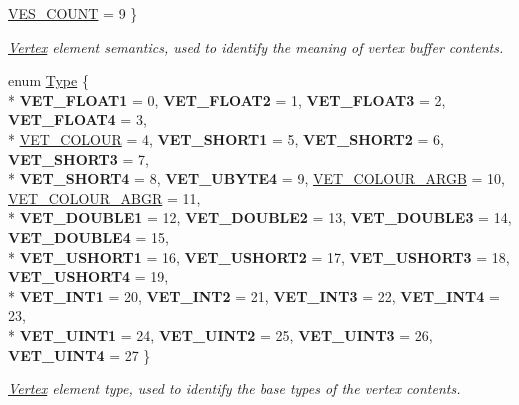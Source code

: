 \begin{DoxyCompactItemize}
\hyperlink{class_assimp_1_1_ogre_1_1_vertex_element_a34497be6620a9ecece6ff193a044d6bba3b4b518fc1b8d3e0cdbe053f37e95e31}{V\+E\+S\+\_\+\+C\+O\+U\+N\+T} = 9
 \}
\begin{DoxyCompactList}\small\item\em \hyperlink{class_assimp_1_1_vertex}{Vertex} element semantics, used to identify the meaning of vertex buffer contents. \end{DoxyCompactList}\item 
enum \hyperlink{class_assimp_1_1_ogre_1_1_vertex_element_a7737b533321652d410d9d1f09997a038}{Type} \{ \\*
{\bfseries V\+E\+T\+\_\+\+F\+L\+O\+A\+T1} = 0, 
{\bfseries V\+E\+T\+\_\+\+F\+L\+O\+A\+T2} = 1, 
{\bfseries V\+E\+T\+\_\+\+F\+L\+O\+A\+T3} = 2, 
{\bfseries V\+E\+T\+\_\+\+F\+L\+O\+A\+T4} = 3, 
\\*
\hyperlink{class_assimp_1_1_ogre_1_1_vertex_element_a7737b533321652d410d9d1f09997a038ac3ec8b6e0ff749b1add97c5c9b1d972b}{V\+E\+T\+\_\+\+C\+O\+L\+O\+U\+R} = 4, 
{\bfseries V\+E\+T\+\_\+\+S\+H\+O\+R\+T1} = 5, 
{\bfseries V\+E\+T\+\_\+\+S\+H\+O\+R\+T2} = 6, 
{\bfseries V\+E\+T\+\_\+\+S\+H\+O\+R\+T3} = 7, 
\\*
{\bfseries V\+E\+T\+\_\+\+S\+H\+O\+R\+T4} = 8, 
{\bfseries V\+E\+T\+\_\+\+U\+B\+Y\+T\+E4} = 9, 
\hyperlink{class_assimp_1_1_ogre_1_1_vertex_element_a7737b533321652d410d9d1f09997a038a510a6f43b2ac2fe71918793b258350c0}{V\+E\+T\+\_\+\+C\+O\+L\+O\+U\+R\+\_\+\+A\+R\+G\+B} = 10, 
\hyperlink{class_assimp_1_1_ogre_1_1_vertex_element_a7737b533321652d410d9d1f09997a038ad5a8d134163d25bbbc677b4a2019570f}{V\+E\+T\+\_\+\+C\+O\+L\+O\+U\+R\+\_\+\+A\+B\+G\+R} = 11, 
\\*
{\bfseries V\+E\+T\+\_\+\+D\+O\+U\+B\+L\+E1} = 12, 
{\bfseries V\+E\+T\+\_\+\+D\+O\+U\+B\+L\+E2} = 13, 
{\bfseries V\+E\+T\+\_\+\+D\+O\+U\+B\+L\+E3} = 14, 
{\bfseries V\+E\+T\+\_\+\+D\+O\+U\+B\+L\+E4} = 15, 
\\*
{\bfseries V\+E\+T\+\_\+\+U\+S\+H\+O\+R\+T1} = 16, 
{\bfseries V\+E\+T\+\_\+\+U\+S\+H\+O\+R\+T2} = 17, 
{\bfseries V\+E\+T\+\_\+\+U\+S\+H\+O\+R\+T3} = 18, 
{\bfseries V\+E\+T\+\_\+\+U\+S\+H\+O\+R\+T4} = 19, 
\\*
{\bfseries V\+E\+T\+\_\+\+I\+N\+T1} = 20, 
{\bfseries V\+E\+T\+\_\+\+I\+N\+T2} = 21, 
{\bfseries V\+E\+T\+\_\+\+I\+N\+T3} = 22, 
{\bfseries V\+E\+T\+\_\+\+I\+N\+T4} = 23, 
\\*
{\bfseries V\+E\+T\+\_\+\+U\+I\+N\+T1} = 24, 
{\bfseries V\+E\+T\+\_\+\+U\+I\+N\+T2} = 25, 
{\bfseries V\+E\+T\+\_\+\+U\+I\+N\+T3} = 26, 
{\bfseries V\+E\+T\+\_\+\+U\+I\+N\+T4} = 27
 \}
\begin{DoxyCompactList}\small\item\em \hyperlink{class_assimp_1_1_vertex}{Vertex} element type, used to identify the base types of the vertex contents. \end{DoxyCompactList}\end{DoxyCompactItemize}

